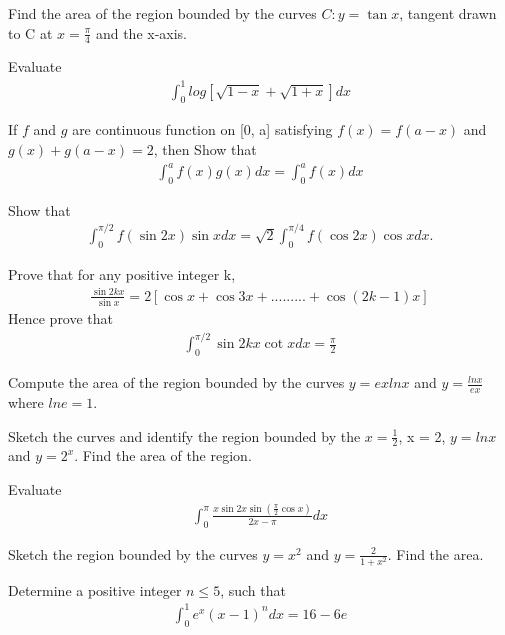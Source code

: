 \item Find the area of the region bounded by the curves $C: y = \tan x$, tangent drawn to C at $x = \frac{\pi}{4}$ and the x-axis.

\item Evaluate
\begin{align*}
\int_{0}^{1}log[\sqrt{1 - x} + \sqrt{1 + x}]dx
\end{align*}

\item If $f$ and $g$ are continuous function on [0, a] satisfying $f(x) = f(a - x)$ and $g(x) + g(a - x) = 2$, then Show that 
\begin{align*}
\int_{0}^{a}f(x)g(x)dx = \int_{0}^{a}f(x)dx
\end{align*}

\item Show that
\begin{align*}
\int_{0}^{\pi/2}f(\sin 2x)\sin x dx = \sqrt{2}\int_{0}^{\pi/4}f(\cos 2x)\cos x dx.
\end{align*}

\item Prove that for any positive integer k,
\begin{align*}
\frac{\sin 2kx}{\sin x} = 2[\cos x + \cos 3x + .........+\cos(2k - 1)x]
\end{align*}
Hence prove that
\begin{align*}
\int_{0}^{\pi/2}\sin 2kx \cot x dx = \frac{\pi}{2}
\end{align*}

\item Compute the area of the region bounded by the curves $y = ex lnx$ and $y = \frac{lnx}{ex}$ where $lne = 1$.

\item Sketch the curves and identify the region bounded by the $x = \frac{1}{2}$, x = 2, $y = lnx$ and $y = 2^x$. Find the area of the region.  

\item Evaluate
\begin{align*}
\int_{0}^{\pi}\frac{x \sin 2x \sin(\frac{\pi}{2}\cos x)}{2x - \pi}dx
\end{align*}

\item Sketch the region bounded by the curves $y = x^2$ and $y = \frac{2}{1 + x^2}$. Find the area.

\item Determine a positive integer $n \leq 5$, such that
\begin{align*}
\int_{0}^{1}e^x(x - 1)^{n}dx = 16 - 6e
\end{align*}

